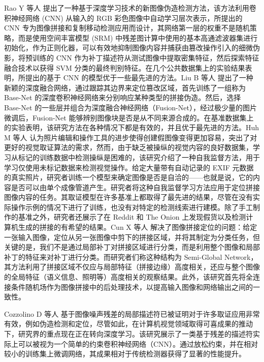Rao Y 等人 \cite{rao2016deep} 提出了一种基于深度学习技术的新图像伪造检测方法，该方法利用卷积神经网络 (CNN) 从输入的 RGB 彩色图像中自动学习层次表示，所提出的 CNN 专为图像拼接和复制移动检测应用而设计，其网络第一层的权重不是随机策略，而是使用空间丰富模型 (SRM) 中残差图计算中使用的基本高通滤波器集进行初始化，作为正则化器，可以有效地抑制图像内容并捕获由篡改操作引入的细微伪影，将预训练的 CNN 作为补丁描述符从测试图像中提取密集特征，然后探索特征融合技术以获得 SVM 分类的最终判别特征。在几个公共数据集上的实验结果表明，所提出的基于 CNN 的模型优于一些最先进的方法。Liu B 等人 \cite{liu2018deep} 提出了一种新颖的深度融合网络，通过跟踪其边界来定位篡改区域，首先训练了一组称为 Base-Net 的深度卷积神经网络来分别响应某种类型的拼接伪造。然后，选择 Base-Net 的一些层并组合为深度融合神经网络（Fusion-Net），经过极少量的图片微调后，Fusion-Net 能够辨别图像块是否是从不同来源合成的。在基准数据集上的实验表明，该研究方法在各种情况下都是有效的，并且优于最先进的方法。Huh M 等人  \cite{huh2018fighting} 认为照片编辑和操作工具的进步使得创建假图像变得更加容易，突出了对更好的视觉取证算法的需求，然而，由于缺乏被操纵的视觉内容的良好数据集，学习从标记的训练数据中检测操纵是困难的，该研究介绍了一种自我监督方法，用于学习仅使用未标记数据来检测视觉操作。给定大量带有自动记录的 EXIF 元数据的真实照片，研究者训练一个模型来确定图像是否是自洽的——也就是说，它的内容是否可以由单个成像管道产生。研究者将这种自我监督学习方法应用于定位拼接图像内容的任务。其取证模型在许多基准上都取得了最先进的结果，尽管在没有实际操作示例的情况下进行了训练，也没有对特定的检测线索进行建模。除了手工制作的基准之外，研究者还展示了在 Reddit 和 The Onion 上发现假货以及检测计算机生成的拼接的有希望的结果。Cun X 等人 \cite{cun2018image} 解决了图像拼接定位的问题：给定一张输入图像，定位从另一张图像中剪下的拼接区域，并将其制定为分类任务，但关键的是，我们不是通过局部补丁对拼接区域进行分类，而是利用整个图像和局部补丁的特征来对补丁进行分类。而研究者们称这种结构为 Semi-Global Network，其方法利用了拼接区域不仅应与局部特征（拼接边缘）高度相关，还应与整个图像的全局特征（语义信息、照明等）高度相关的观察结果。此外，该研究首先将全连接条件随机场作为图像拼接中的后处理技术，以提高输入图像和网络输出之间的一致性。

Cozzolino D 等人 \cite{cozzolino2017recasting} 基于图像噪声残差的局部描述符已被证明对于许多取证应用非常有效，例如伪造检测和定位，尽管如此，在计算机视觉领域取得可喜成果的推动下，研究界的重点现在正在转向深度学习。该研究展示了一类基于残差的描述符实际上可以被视为一个简单的约束卷积神经网络（CNN）。通过放松约束，并在相对较小的训练集上微调网络，其成果相对于传统检测器获得了显著的性能提升。

